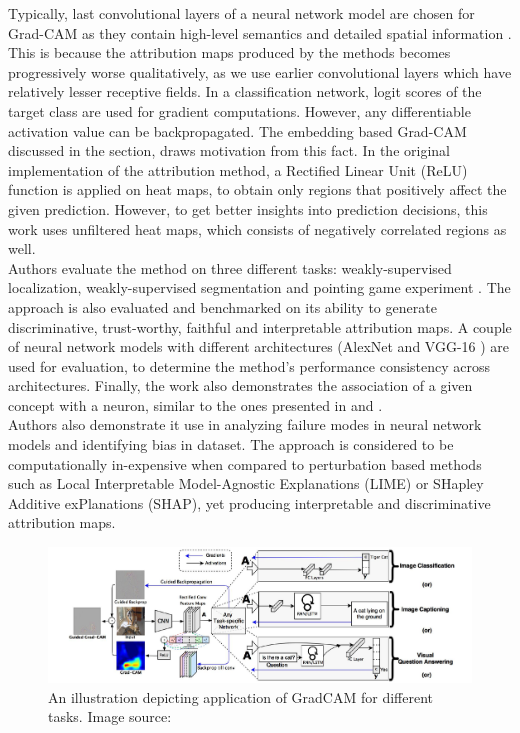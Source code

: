 \documentclass[../report.tex]{subfiles}
\begin{document}
	Typically, last convolutional layers of a neural network model are chosen for Grad-CAM as they contain high-level semantics and detailed spatial information \cite{selvaraju2017grad}. This is because the attribution maps produced by the methods becomes progressively worse qualitatively,  as we use earlier convolutional layers which have relatively lesser receptive fields. In a classification network, logit scores of the target class are used for gradient computations. However, any differentiable activation value can be backpropagated. The embedding based Grad-CAM discussed in the section, draws motivation from this fact. In the original implementation of the attribution method, a Rectified Linear Unit (ReLU) function is applied on heat maps, to obtain only regions that positively affect the given prediction. However, to get better insights into prediction decisions, this work uses unfiltered heat maps, which consists of negatively correlated regions as well.\\  
   Authors evaluate the method on three different tasks: weakly-supervised localization, weakly-supervised segmentation and pointing game experiment \cite{zhang2018top}. The approach is also evaluated and benchmarked on its ability to generate discriminative, trust-worthy, faithful and interpretable attribution maps. A couple of neural network models with different architectures (AlexNet \cite{krizhevsky2012imagenet} and VGG-16 \cite{simonyan2014very}) are used for evaluation, to determine the method’s performance consistency across architectures.
   Finally, the work also demonstrates the association of a given concept with a neuron, similar to the ones presented in \cite{matthew2014visualizing} and \cite{zhou2014object}.\\
	Authors also demonstrate it use in analyzing failure modes in neural network models and identifying bias in dataset.
	The approach is considered to be computationally in-expensive when compared to perturbation based methods such as Local Interpretable Model-Agnostic Explanations (LIME) \cite{lime} or SHapley Additive exPlanations (SHAP)\cite{shap}, yet producing interpretable and discriminative attribution maps.
	 \begin{figure}[H]
		\hspace{-1cm}
		\includegraphics[scale=0.3]{images/chapter3/gradcam.png}
		\caption{An illustration depicting application of GradCAM for different tasks. Image source: \cite{selvaraju2017grad}}
		\label{fig_gradcam}
	\end{figure}
		
\end{document}

